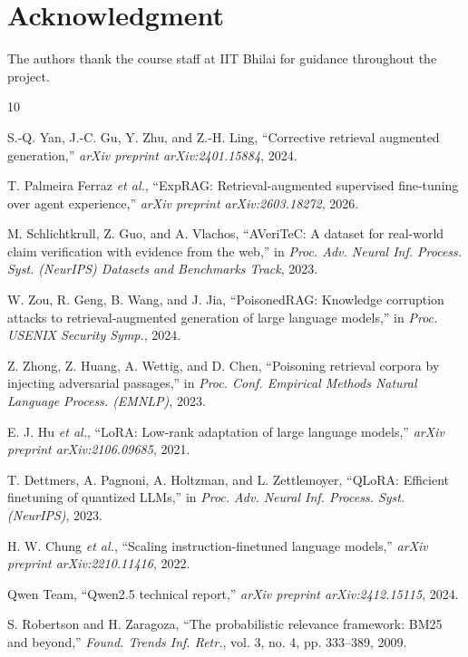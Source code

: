 \documentclass[journal]{IEEEtran}
\begin{document}
\section*{Acknowledgment}
The authors thank the course staff at IIT Bhilai for guidance throughout the
project.

\begin{thebibliography}{10}

S.-Q. Yan, J.-C. Gu, Y. Zhu, and Z.-H. Ling, ``Corrective retrieval augmented
generation,'' \emph{arXiv preprint arXiv:2401.15884}, 2024.

T. Palmeira Ferraz \emph{et al.}, ``ExpRAG: Retrieval-augmented supervised
fine-tuning over agent experience,'' \emph{arXiv preprint arXiv:2603.18272},
2026.

M. Schlichtkrull, Z. Guo, and A. Vlachos, ``AVeriTeC: A dataset for real-world
claim verification with evidence from the web,'' in \emph{Proc. Adv. Neural Inf.
Process. Syst. (NeurIPS) Datasets and Benchmarks Track}, 2023.

W. Zou, R. Geng, B. Wang, and J. Jia, ``PoisonedRAG: Knowledge corruption attacks
to retrieval-augmented generation of large language models,'' in \emph{Proc.
USENIX Security Symp.}, 2024.

Z. Zhong, Z. Huang, A. Wettig, and D. Chen, ``Poisoning retrieval corpora by
injecting adversarial passages,'' in \emph{Proc. Conf. Empirical Methods Natural
Language Process. (EMNLP)}, 2023.

E. J. Hu \emph{et al.}, ``LoRA: Low-rank adaptation of large language models,''
\emph{arXiv preprint arXiv:2106.09685}, 2021.

T. Dettmers, A. Pagnoni, A. Holtzman, and L. Zettlemoyer, ``QLoRA: Efficient
finetuning of quantized LLMs,'' in \emph{Proc. Adv. Neural Inf. Process. Syst.
(NeurIPS)}, 2023.

H. W. Chung \emph{et al.}, ``Scaling instruction-finetuned language models,''
\emph{arXiv preprint arXiv:2210.11416}, 2022.

Qwen Team, ``Qwen2.5 technical report,'' \emph{arXiv preprint arXiv:2412.15115},
2024.

S. Robertson and H. Zaragoza, ``The probabilistic relevance framework: BM25 and
beyond,'' \emph{Found. Trends Inf. Retr.}, vol. 3, no. 4, pp. 333--389, 2009.

\end{thebibliography}
\end{document}
